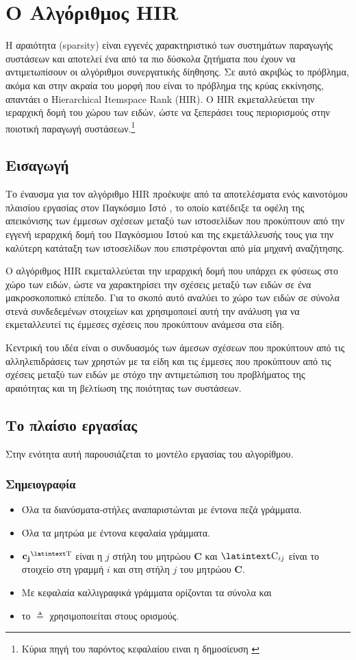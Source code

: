 \chapter{Ο Αλγόριθμος {\en HIR}}
\label{Chapter3}
Η αραιότητα ({\en sparsity}) είναι εγγενές χαρακτηριστικό των συστημάτων παραγωγής συστάσεων και αποτελεί ένα από τα πιο δύσκολα ζητήματα που έχουν να αντιμετωπίσουν οι αλγόριθμοι συνεργατικής δίηθησης. Σε αυτό ακριβώς το πρόβλημα, ακόμα και στην ακραία του μορφή που είναι το πρόβλημα της κρύας εκκίνησης, απαντάει ο {\en Hierarchical Itemspace Rank (HIR). O HIR} εκμεταλλεύεται την ιεραρχική δομή του χώρου των ειδών, ώστε να ξεπεράσει τους περιορισμούς στην ποιοτική παραγωγή συστάσεων\cite{Nikolakopoulos2015126}.\footnote{Κύρια πηγή του παρόντος κεφαλαίου ειναι η δημοσίευση \cite{Nikolakopoulos2015126}}
\section{Εισαγωγή}
Το έναυσμα για τον αλγόριθμο {\en HIR} προέκυψε από τα αποτελέσματα ενός καινοτόμου πλαισίου εργασίας στον Παγκόσμιο Ιστό \cite{Nikolakopoulos:2013:NNR:2433396.2433415}, το οποίο κατέδειξε τα οφέλη της απεικόνισης των έμμεσων σχέσεων μεταξύ των ιστοσελίδων που προκύπτουν από την εγγενή ιεραρχική δομή του Παγκόσμιου Ιστού και της εκμετάλλευσής τους για την καλύτερη κατάταξη των ιστοσελίδων που επιστρέφονται από μία μηχανή αναζήτησης. \par
Ο αλγόριθμος {\en HIR} εκμεταλλεύεται την ιεραρχική δομή που υπάρχει εκ φύσεως στο χώρο των ειδών, ώστε να χαρακτηρίσει την σχέσεις μεταξύ των ειδών σε ένα μακροσκοποπικό επίπεδο. Για το σκοπό αυτό αναλύει το χώρο των ειδών σε σύνολα στενά συνδεδεμένων στοιχείων και χρησιμοποιεί αυτή την ανάλυση για να εκμεταλλευτεί τις έμμεσες σχέσεις που προκύπτουν ανάμεσα στα είδη. \par
Κεντρική του ιδέα είναι ο συνδυασμός των άμεσων σχέσεων που προκύπτουν από τις αλληλεπιδράσεις των χρηστών με τα είδη και τις έμμεσες που προκύπτουν από τις σχέσεις μεταξύ των ειδών με στόχο την αντιμετώπιση του προβλήματος της αραιότητας και τη βελτίωση της ποιότητας των συστάσεων.
\section{Το πλαίσιο εργασίας}
Στην ενότητα αυτή παρουσιάζεται το μοντέλο εργασίας του αλγορίθμου.
\subsection{Σημειογραφία}
\begin{itemize}
 \item Όλα τα διανύσματα-στήλες αναπαριστώνται με έντονα πεζά γράμματα.
 \item Όλα τα μητρώα με έντονα κεφαλαία γράμματα.
 \item $\mathbf{c_j}^\text{\en T}$ είναι η $j$ στήλη του μητρώου $\mathbf{C}$ και $\text{\en C}_{ij}$ είναι το στοιχείο στη γραμμή $i$ και στη στήλη $j$ του μητρώου $\mathbf{C}$.
 \item Με κεφαλαία καλλιγραφικά γράμματα ορίζονται τα σύνολα και
 \item το $\triangleq$ χρησιμοποιείται στους ορισμούς.
\end{itemize}
